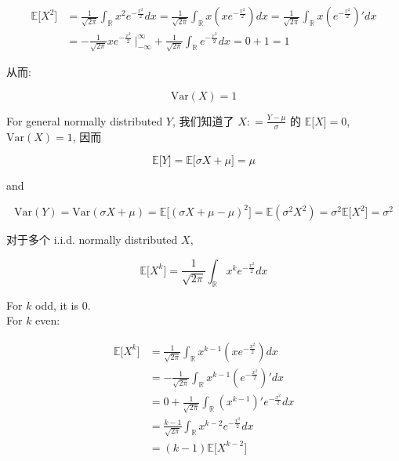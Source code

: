 \begin{itemize}
  \[\begin{matrix}
  {\mathbb{E}\lbrack\mathit{X}^{2}\rbrack} & {= \frac{1}{\sqrt{2\mathit{\pi}}}\int_{\mathbb{R}}\mathit{x}^{2}\mathit{e}^{- \frac{\mathit{x}^{2}}{2}}\mathit{d}\mathit{x} = \frac{1}{\sqrt{2\mathit{\pi}}}\int_{\mathbb{R}}\mathit{x}(\mathit{x}\mathit{e}^{- \frac{\mathit{x}^{2}}{2}})\mathit{d}\mathit{x} = \frac{1}{\sqrt{2\mathit{\pi}}}\int_{\mathbb{R}}\mathit{x}(\mathit{e}^{- \frac{\mathit{x}^{2}}{2}})'\mathit{d}\mathit{x}} \\
   & {= - \frac{1}{\sqrt{2\mathit{\pi}}}\mathit{x}\mathit{e}^{- \frac{\mathit{x}^{2}}{2}}\ |_{- \infty}^{\infty} + \frac{1}{\sqrt{2\mathit{\pi}}}\int_{\mathbb{R}}\mathit{e}^{- \frac{\mathit{x}^{2}}{2}}\mathit{d}\mathit{x} = 0 + 1 = 1}
  \end{matrix}\]

  从而:

  \[\text{Var}(\mathit{X}) = 1\]

  For general normally distributed \(\mathit{Y}\), 我们知道了 \(\mathit{X}: = \frac{\mathit{Y} - \mathit{\mu}}{\mathit{\sigma}}\) 的 \(\mathbb{E}\lbrack\mathit{X}\rbrack = 0\), \(\text{Var}(\mathit{X}) = 1\), 因而

  \[\mathbb{E}\lbrack\mathit{Y}\rbrack = \mathbb{E}\lbrack\mathit{\sigma}\mathit{X} + \mathit{\mu}\rbrack = \mathit{\mu}\]

  and

  \[\text{Var}(\mathit{Y}) = \text{Var}(\mathit{\sigma}\mathit{X} + \mathit{\mu}) = \mathbb{E}\lbrack(\mathit{\sigma}\mathit{X} + \mathit{\mu} - \mathit{\mu})^{2}\rbrack = \mathbb{E}(\mathit{\sigma}^{2}\mathit{X}^{2}) = \mathit{\sigma}^{2}\mathbb{E}\lbrack\mathit{X}^{2}\rbrack = \mathit{\sigma}^{2}\]

  对于多个 i.i.d. normally distributed \(\mathit{X}\),

  \[\mathbb{E}\lbrack\mathit{X}^{\mathit{k}}\rbrack = \frac{1}{\sqrt{2\mathit{\pi}}}\int_{\mathbb{R}}\mathit{x}^{\mathit{k}}\mathit{e}^{- \frac{\mathit{x}^{2}}{2}}\mathit{d}\mathit{x}\]

  For \(\mathit{k}\) odd, it is \(0\).\\
  For \(\mathit{k}\) even:

  \[\begin{matrix}
  {\mathbb{E}\lbrack\mathit{X}^{\mathit{k}}\rbrack} & {= \frac{1}{\sqrt{2\mathit{\pi}}}\int_{\mathbb{R}}\mathit{x}^{\mathit{k} - 1}(\mathit{x}\mathit{e}^{- \frac{\mathit{x}^{2}}{2}})\mathit{d}\mathit{x}} \\
   & {= - \frac{1}{\sqrt{2\mathit{\pi}}}\int_{\mathbb{R}}\mathit{x}^{\mathit{k} - 1}(\mathit{e}^{- \frac{\mathit{x}^{2}}{2}})'\mathit{d}\mathit{x}} \\
   & {= 0 + \frac{1}{\sqrt{2\mathit{\pi}}}\int_{\mathbb{R}}(\mathit{x}^{\mathit{k} - 1})'\mathit{e}^{- \frac{\mathit{x}^{2}}{2}}\mathit{d}\mathit{x}} \\
   & {= \frac{\mathit{k} - 1}{\sqrt{2\mathit{\pi}}}\int_{\mathbb{R}}\mathit{x}^{\mathit{k} - 2}\mathit{e}^{- \frac{\mathit{x}^{2}}{2}}\mathit{d}\mathit{x}} \\
   & {= (\mathit{k} - 1)\mathbb{E}\lbrack\mathit{X}^{\mathit{k} - 2}\rbrack}
  \end{matrix}\]


\end{itemize}

